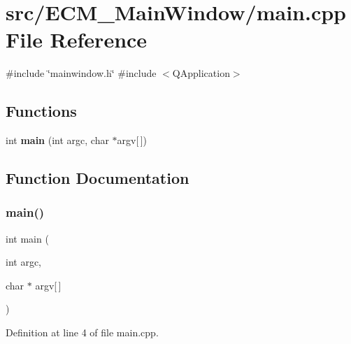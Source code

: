 \section{src/\+E\+C\+M\+\_\+\+Main\+Window/main.cpp File Reference}
\label{_e_c_m___main_window_2main_8cpp}
{\ttfamily \#include \char`\"{}mainwindow.\+h\char`\"{}}\newline
{\ttfamily \#include $<$Q\+Application$>$}\newline
\subsection*{Functions}
\begin{DoxyCompactItemize}
\item 
int \textbf{ main} (int argc, char $\ast$argv[$\,$])
\end{DoxyCompactItemize}


\subsection{Function Documentation}
\mbox{\label{_e_c_m___main_window_2main_8cpp_a0ddf1224851353fc92bfbff6f499fa97}} 
\subsubsection{main()}
{\footnotesize\ttfamily int main (\begin{DoxyParamCaption}\item[{int}]{argc,  }\item[{char $\ast$}]{argv[$\,$] }\end{DoxyParamCaption})}



Definition at line 4 of file main.\+cpp.


